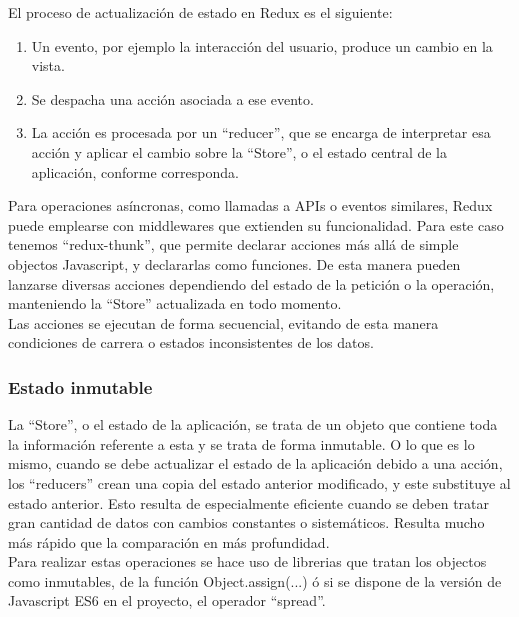El proceso de actualización de estado en Redux es el siguiente: 

\begin{enumerate}  
	\item  Un evento, por ejemplo la interacción del usuario, produce un cambio en la vista.
	\item Se despacha una acción asociada a ese evento. 
	\item La acción es procesada por un \hyphenquote{spanish}{reducer}, que se encarga de interpretar esa acción y aplicar el cambio sobre la \hyphenquote{spanish}{Store}, o el estado central de la aplicación, conforme corresponda.
\end{enumerate}

Para operaciones asíncronas, como llamadas a APIs o eventos similares, Redux puede emplearse con middlewares que extienden su funcionalidad. Para este caso tenemos \hyphenquote{spanish}{redux-thunk}, que permite declarar acciones más allá de simple objectos Javascript, y declararlas como funciones. De esta manera pueden lanzarse diversas acciones dependiendo del estado de la petición o la operación, manteniendo la \hyphenquote{spanish}{Store} actualizada en todo momento. \\

Las acciones se ejecutan de forma secuencial, evitando de esta manera condiciones de carrera o estados inconsistentes de los datos. \\

\subsubsection {Estado inmutable}

La \hyphenquote{spanish}{Store}, o el estado de la aplicación, se trata de un objeto que contiene toda la información referente a esta y se trata de forma inmutable. O lo que es lo mismo, cuando se debe actualizar el estado de la aplicación debido a una acción, los \hyphenquote{spanish}{reducers} crean una copia del estado anterior modificado, y este substituye al estado anterior. Esto resulta de especialmente eficiente cuando se deben tratar gran cantidad de datos con cambios constantes o sistemáticos. Resulta mucho más rápido que la comparación en más profundidad. \\

Para realizar estas operaciones se hace uso de librerias que tratan los objectos como inmutables, de la función Object.assign(...) ó si se dispone de la versión de Javascript ES6 en el proyecto, el operador \hyphenquote{spanish}{spread}. \\

